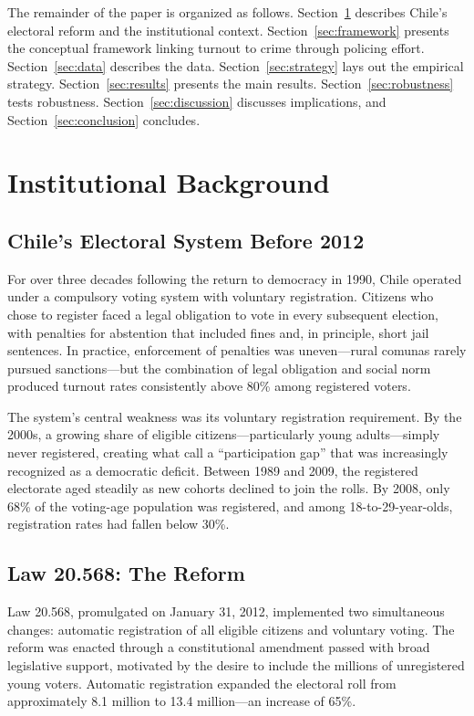 \documentclass[12pt]{article}
\begin{document}
The remainder of the paper is organized as follows. Section~\ref{sec:background} describes Chile's electoral reform and the institutional context. Section~\ref{sec:framework} presents the conceptual framework linking turnout to crime through policing effort. Section~\ref{sec:data} describes the data. Section~\ref{sec:strategy} lays out the empirical strategy. Section~\ref{sec:results} presents the main results. Section~\ref{sec:robustness} tests robustness. Section~\ref{sec:discussion} discusses implications, and Section~\ref{sec:conclusion} concludes.


\section{Institutional Background}\label{sec:background}

\subsection{Chile's Electoral System Before 2012}

For over three decades following the return to democracy in 1990, Chile operated under a compulsory voting system with voluntary registration. Citizens who chose to register faced a legal obligation to vote in every subsequent election, with penalties for abstention that included fines and, in principle, short jail sentences. In practice, enforcement of penalties was uneven---rural comunas rarely pursued sanctions---but the combination of legal obligation and social norm produced turnout rates consistently above 80\% among registered voters.

The system's central weakness was its voluntary registration requirement. By the 2000s, a growing share of eligible citizens---particularly young adults---simply never registered, creating what \citet{Barnes2014} call a ``participation gap'' that was increasingly recognized as a democratic deficit. Between 1989 and 2009, the registered electorate aged steadily as new cohorts declined to join the rolls. By 2008, only 68\% of the voting-age population was registered, and among 18-to-29-year-olds, registration rates had fallen below 30\%.

\subsection{Law 20.568: The Reform}

Law 20.568, promulgated on January 31, 2012, implemented two simultaneous changes: automatic registration of all eligible citizens and voluntary voting. The reform was enacted through a constitutional amendment passed with broad legislative support, motivated by the desire to include the millions of unregistered young voters. Automatic registration expanded the electoral roll from approximately 8.1 million to 13.4 million---an increase of 65\%.
\end{document}
